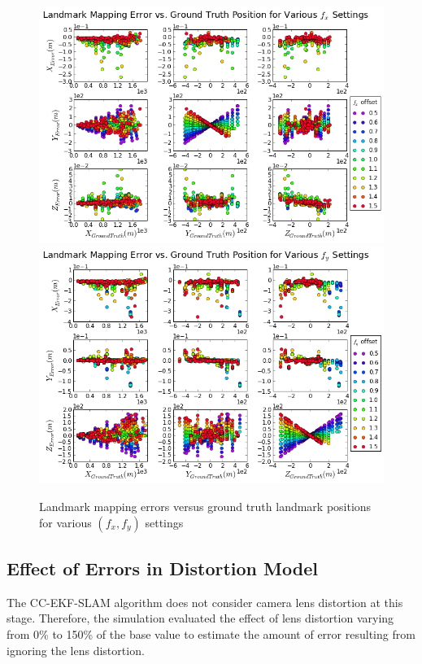 \begin{figure}[h]
  \centering
  \includegraphics[width=13cm,keepaspectratio=true]{./Figures/SimulationFigures/Figure41.png}
  \includegraphics[width=13cm,keepaspectratio=true]{./Figures/SimulationFigures/Figure42.png}
  \caption{Landmark mapping errors versus ground truth
    landmark positions for various $(f_x, f_y)$ settings}
  \label{fig:simfig41-42}
\end{figure}
\FloatBarrier

\subsection{Effect of Errors in Distortion Model}
The CC-EKF-SLAM algorithm does not consider camera lens distortion
at this stage. Therefore, the simulation evaluated the effect of
lens distortion varying from 0\% to 150\% of the base value to
estimate the amount of error resulting from ignoring the lens distortion.

